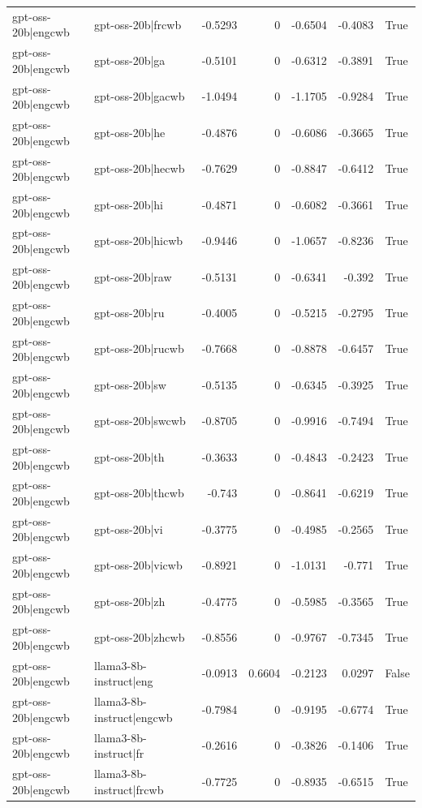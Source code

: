 \begin{table}
\begin{tabular}{l l r r r r l}
gpt-oss-20b|engcwb & gpt-oss-20b|frcwb & -0.5293 & 0 & -0.6504 & -0.4083 & True \\
gpt-oss-20b|engcwb & gpt-oss-20b|ga & -0.5101 & 0 & -0.6312 & -0.3891 & True \\
gpt-oss-20b|engcwb & gpt-oss-20b|gacwb & -1.0494 & 0 & -1.1705 & -0.9284 & True \\
gpt-oss-20b|engcwb & gpt-oss-20b|he & -0.4876 & 0 & -0.6086 & -0.3665 & True \\
gpt-oss-20b|engcwb & gpt-oss-20b|hecwb & -0.7629 & 0 & -0.8847 & -0.6412 & True \\
gpt-oss-20b|engcwb & gpt-oss-20b|hi & -0.4871 & 0 & -0.6082 & -0.3661 & True \\
gpt-oss-20b|engcwb & gpt-oss-20b|hicwb & -0.9446 & 0 & -1.0657 & -0.8236 & True \\
gpt-oss-20b|engcwb & gpt-oss-20b|raw & -0.5131 & 0 & -0.6341 & -0.392 & True \\
gpt-oss-20b|engcwb & gpt-oss-20b|ru & -0.4005 & 0 & -0.5215 & -0.2795 & True \\
gpt-oss-20b|engcwb & gpt-oss-20b|rucwb & -0.7668 & 0 & -0.8878 & -0.6457 & True \\
gpt-oss-20b|engcwb & gpt-oss-20b|sw & -0.5135 & 0 & -0.6345 & -0.3925 & True \\
gpt-oss-20b|engcwb & gpt-oss-20b|swcwb & -0.8705 & 0 & -0.9916 & -0.7494 & True \\
gpt-oss-20b|engcwb & gpt-oss-20b|th & -0.3633 & 0 & -0.4843 & -0.2423 & True \\
gpt-oss-20b|engcwb & gpt-oss-20b|thcwb & -0.743 & 0 & -0.8641 & -0.6219 & True \\
gpt-oss-20b|engcwb & gpt-oss-20b|vi & -0.3775 & 0 & -0.4985 & -0.2565 & True \\
gpt-oss-20b|engcwb & gpt-oss-20b|vicwb & -0.8921 & 0 & -1.0131 & -0.771 & True \\
gpt-oss-20b|engcwb & gpt-oss-20b|zh & -0.4775 & 0 & -0.5985 & -0.3565 & True \\
gpt-oss-20b|engcwb & gpt-oss-20b|zhcwb & -0.8556 & 0 & -0.9767 & -0.7345 & True \\
gpt-oss-20b|engcwb & llama3-8b-instruct|eng & -0.0913 & 0.6604 & -0.2123 & 0.0297 & False \\
gpt-oss-20b|engcwb & llama3-8b-instruct|engcwb & -0.7984 & 0 & -0.9195 & -0.6774 & True \\
gpt-oss-20b|engcwb & llama3-8b-instruct|fr & -0.2616 & 0 & -0.3826 & -0.1406 & True \\
gpt-oss-20b|engcwb & llama3-8b-instruct|frcwb & -0.7725 & 0 & -0.8935 & -0.6515 & True \\

\end{tabular}
\end{table}
